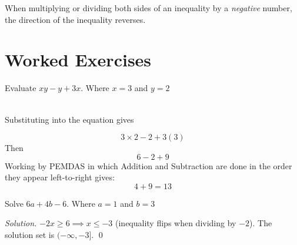 \documentclass{article}
\begin{document}
\begin{note}
  When multiplying or dividing both sides of an inequality by a
  \emph{negative} number, the direction of the inequality reverses.
\end{note}

\section{Worked Exercises}

\begin{exercise}
  Evaluate $xy - y + 3x$. Where $x = 3$ and $y = 2$

  \\
  Substituting into the equation gives

  \[3 \times 2 - 2 + 3(3)\]
  Then
  \[6 - 2 + 9\]
  Working by PEMDAS in which Addition and Subtraction are done in the order they appear left-to-right gives:
  \[4+9 = 13\]
\end{exercise}


\begin{exercise}
  Solve $6a+ 4b - 6$. Where $a = 1$ and $b = 3$
\end{exercise}

\textit{Solution.}
$-2x \geq 6 \implies x \leq -3$ (inequality flips when dividing by $-2$).
The solution set is $(-\infty, -3]$. \qed



\end{document}
